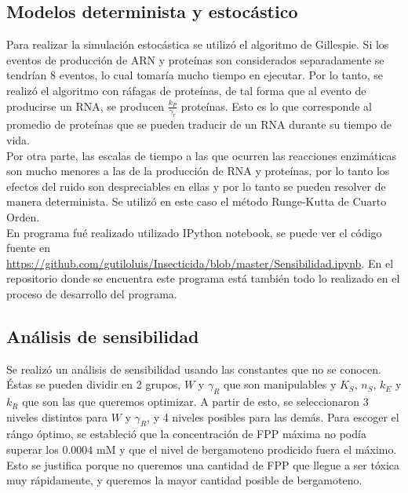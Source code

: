 \documentclass[12pt]{article}
\begin{document}
\subsection{Modelos determinista y estoc\'astico}

Para realizar la simulaci\'on estoc\'astica se utiliz\'o el algoritmo de Gillespie. Si los eventos de producci\'on de ARN y prote\'inas son considerados separadamente se tendr\'ian 8 eventos, lo cual tomar\'ia mucho tiempo en ejecutar. Por lo tanto, se realiz\'o el algoritmo con r\'afagas de prote\'inas, de tal forma que al evento de producirse un RNA, se producen $\frac{k_P}{\gamma_r}$ prote\'inas. Esto es lo que corresponde al promedio de prote\'inas que se pueden traducir de un RNA durante su tiempo de vida.\\

Por otra parte, las escalas de tiempo a las que ocurren las reacciones enzim\'aticas son mucho menores a las de la producci\'on de RNA y prote\'inas, por lo tanto los efectos del ruido son despreciables en ellas y por lo tanto se pueden resolver de manera determinista. Se utiliz\'o en este caso el m\'etodo Runge-Kutta de Cuarto Orden.\\

En programa fu\'e realizado utilizado IPython notebook, se puede ver el c\'odigo fuente en \url{https://github.com/gutiloluis/Insecticida/blob/master/Sensibilidad.ipynb}. En el repositorio donde se encuentra este programa est\'a tambi\'en todo lo realizado en el proceso de desarrollo del programa.

\subsection{An\'alisis de sensibilidad}
\label{sens}
Se realiz\'o un an\'alisis de sensibilidad usando las constantes que no se conocen. \'Estas se pueden dividir en 2 grupos, $W$ y $\gamma_R$ que son manipulables y $K_S$, $n_S$, $k_E$ y $k_R$ que son las que queremos optimizar. A partir de esto, se seleccionaron 3 niveles distintos para $W$ y $\gamma_R$, y 4 niveles posibles para las dem\'as. Para escoger el r\'ango \'optimo, se estableci\'o que la concentraci\'on de FPP m\'axima no pod\'ia superar los $0.0004 $ mM y que el nivel de bergamoteno prodicido fuera el m\'aximo. Esto se justifica porque no queremos una cantidad de FPP que llegue a ser t\'oxica muy r\'apidamente, y queremos la mayor cantidad posible de bergamoteno.\\
\end{document}

